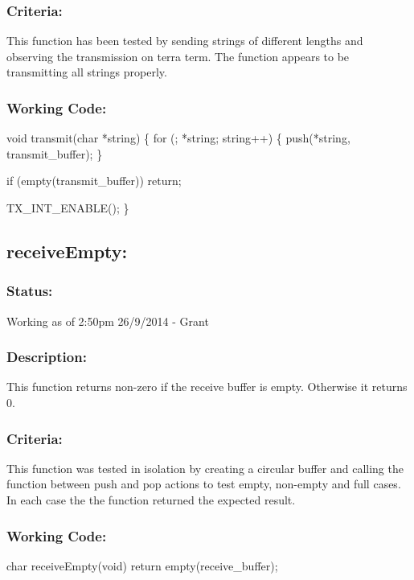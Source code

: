 \documentclass[]{article}
\begin{document}
\subsubsection{Criteria:}
This function has been tested by sending strings of different lengths and observing the transmission on terra term. The function appears to be transmitting all strings properly.

\subsubsection{Working Code:}
void transmit(char *string) \newline
\{ \newline
	for (; *string; string++) \newline
	\{ \newline
		push(*string, transmit\_buffer); \newline
	\} \newline
	
	if (empty(transmit\_buffer)) return; \newline
	
	TX\_INT\_ENABLE(); \newline
\} \newline

\subsection{receiveEmpty:}
\subsubsection{Status:}
Working as of 2:50pm 26/9/2014 - Grant

\subsubsection{Description:}
This function returns non-zero if the receive buffer is empty. Otherwise it returns 0.

\subsubsection{Criteria:}
This function was tested in isolation by creating a circular buffer and calling the function between push and pop actions to test empty, non-empty and full cases. In each case the the function returned the expected result.

\subsubsection{Working Code:}
char receiveEmpty(void)
{
	return empty(receive\_buffer);
}
\end{document}
